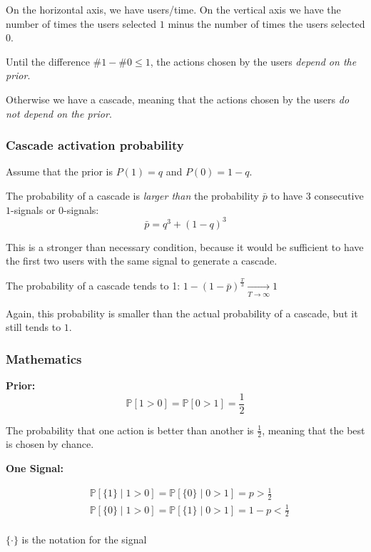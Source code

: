\documentclass[10pt,a4paper]{article}
\begin{document}
On the horizontal axis, we have users/time. On the vertical axis we have the number of times the users selected $1$ minus the number of times the users selected $0$.

Until the difference $\#1 - \#0 \le 1$, the actions chosen by the users \textit{depend on the prior}.

Otherwise we have a cascade, meaning that the actions chosen by the users \textit{do not depend on the prior}.

\subsubsection{Cascade activation probability}\label{cascade-activation-probability}

Assume that the prior is $P(1)=q$ and $P(0)=1-q$.

The probability of a cascade is \textit{larger than} the probability $\bar{p}$ to have $3$ consecutive $1$-signals or $0$-signals:
$$\bar{p} = q^3 + (1 - q)^3$$

This is a stronger than necessary condition, because it would be sufficient to have the first two users with the same signal to generate a cascade.

The probability of a cascade tends to 1:
$1-(1-\bar{p})^{\frac{T}{3}} \xrightarrow[T\rightarrow \infty]{} 1$

Again, this probability is smaller than the actual probability of a cascade, but it still tends to $1$.

\subsubsection{Mathematics}\label{mathematics}

\textbf{Prior:}
$$\mathbb{P}[1>0] =\mathbb{P}[0>1]=\frac{1}{2}$$

The probability that one action is better than another is $\frac{1}{2}$, meaning that the best is chosen by chance.

\textbf{One Signal:}

$$\begin{aligned}
&\mathbb{P}[\{1\} \mid 1>0] =\mathbb{P}[\{0\} \mid 0>1]=p>\frac{1}{2} \\
&\mathbb{P}[\{0\} \mid 1>0] =\mathbb{P}[\{1\} \mid 0>1]=1-p<\frac{1}{2} \\
\end{aligned}$$

$\{\cdot\}$ is the notation for the signal
\end{document}
